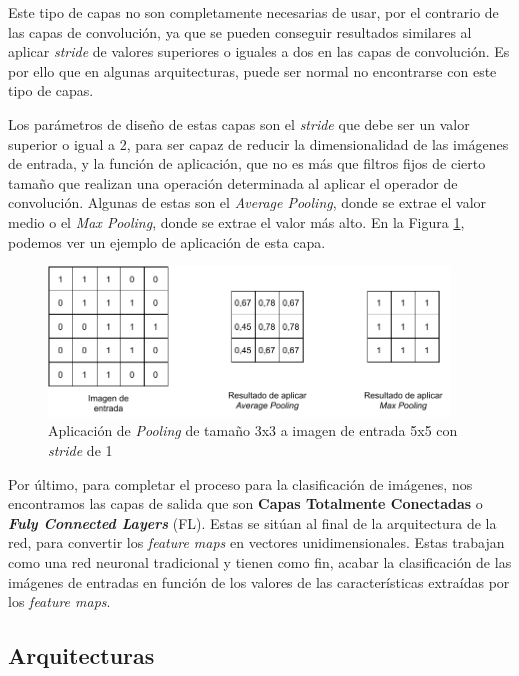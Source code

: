 Este tipo de capas no son completamente necesarias de usar, por el contrario de las capas de convolución, ya que se pueden conseguir resultados similares al aplicar \textit{stride} de valores superiores o iguales a dos en las capas de convolución. Es por ello que en algunas arquitecturas, puede ser normal no encontrarse con este tipo de capas.

Los parámetros de diseño de estas capas son el \textit{stride} que debe ser un valor superior o igual a 2, para ser capaz de reducir la dimensionalidad de las imágenes de entrada, y la función de aplicación, que no es más que filtros fijos de cierto tamaño que realizan una operación determinada al aplicar el operador de convolución. Algunas de estas son el \textit{Average Pooling}, donde se extrae el valor medio o el \textit{Max Pooling}, donde se extrae el valor más alto. En la Figura \ref{fig:pooling}, podemos ver un ejemplo de aplicación de esta capa.\\

\begin{figure}[!h]
\centering
\includegraphics[width=0.95\textwidth]{figuras/desarrollo teorico/Pooling.pdf}
\caption{Aplicación de \textit{Pooling} de tamaño 3x3 a imagen de entrada 5x5 con \textit{stride} de 1}
\label{fig:pooling}
\end{figure}

Por último, para completar el proceso para la clasificación de imágenes, nos encontramos las capas de salida que son \textbf{Capas Totalmente Conectadas} o \textbf{\textit{Fuly Connected Layers}} (FL). Estas se sitúan al final de la arquitectura de la red, para convertir los \textit{feature maps} en vectores unidimensionales. Estas trabajan como una red neuronal tradicional y tienen como fin, acabar la clasificación de las imágenes de entradas en función de los valores de las características extraídas por los \textit{feature maps}.


\subsection{Arquitecturas}

